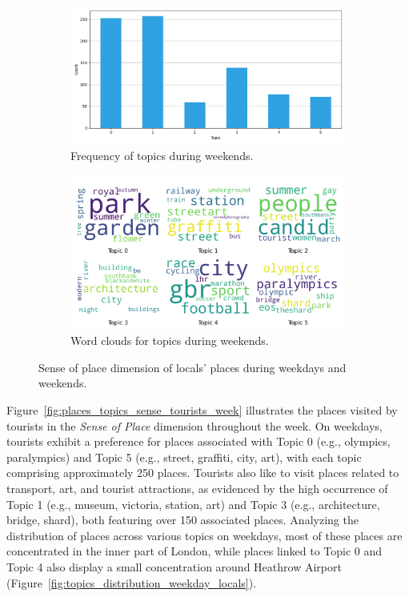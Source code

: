 \documentclass{article}
\theoremstyle{definition}
\theoremstyle{remark}
\begin{document}
\begin{figure}[!h]
    \begin{subfigure}{0.45\textwidth}
        \centering
        \includegraphics[width=\linewidth]{figures/places_sense_weekend_locals.png}
        \caption{Frequency of topics during weekends.}
        \label{fig:places_sense_weekdend_locals}
    \end{subfigure}
    \hfill
    \begin{subfigure}{0.5\textwidth}
        \centering
        \includegraphics[width=\linewidth]{figures/topics_weekend_locals.png}
        \caption{Word clouds for topics during weekends.}
        \label{fig:topics_weekend_locals}
    \end{subfigure}

    \caption{Sense of place dimension of locals' places during weekdays and weekends.}
    \label{fig:places_topics_sense_locals_week}
\end{figure}

Figure~\ref{fig:places_topics_sense_tourists_week} illustrates the places visited by tourists in the \textit{Sense of Place} dimension throughout the week. On weekdays, tourists exhibit a preference for places associated with Topic 0 (e.g., olympics, paralympics) and Topic 5 (e.g., street, graffiti, city, art), with each topic comprising approximately 250 places. Tourists also like to visit places related to transport, art, and tourist attractions, as evidenced by the high occurrence of Topic 1 (e.g., museum, victoria, station, art) and Topic 3 (e.g., architecture, bridge, shard), both featuring over 150 associated places. Analyzing the distribution of places across various topics on weekdays, most of these places are concentrated in the inner part of London, while places linked to Topic 0 and Topic 4 also display a small concentration around Heathrow Airport (Figure~\ref{fig:topics_distribution_weekday_locals}).
\end{document}
